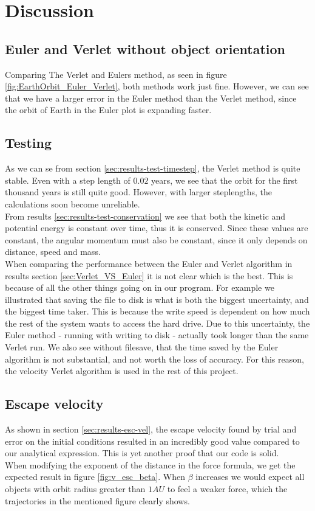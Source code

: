 \documentclass[../main.tex]{subfiles}
\begin{document}
\section{Discussion}\label{sec:discussion}

\subsection{Euler and Verlet without object orientation}
Comparing The Verlet and Eulers method, as seen in figure \ref{fig:EarthOrbit_Euler_Verlet}, both methods work just fine. However, we can see that we have a larger error in the Euler method than the Verlet method, since the orbit of Earth in the Euler plot is expanding faster.

\subsection{Testing}
As we can se from section \ref{sec:results-test-timestep}, the Verlet method is quite stable. Even with a step length of $0.02$ years, we see that the orbit for the first thousand years is still quite good. However, with larger steplengths, the calculations soon become unreliable. \\
From results \ref{sec:results-test-conservation} we see that both the kinetic and potential energy is constant over time, thus it is conserved. Since these values are constant, the angular momentum must also be constant, since it only depends on distance, speed and mass. \\
When comparing the performance between the Euler and Verlet algorithm in results section \ref{sec:Verlet_VS_Euler} it is not clear which is the best. This is because of all the other things going on in our program. For example we illustrated that saving the file to disk is what is both the biggest uncertainty, and the biggest time taker. This is because the write speed is dependent on how much the rest of the system wants to access the hard drive. Due to this uncertainty, the Euler method - running with writing to disk - actually took longer than the same Verlet run. We also see without filesave, that the time saved by the Euler algorithm is not substantial, and not worth the loss of accuracy. For this reason, the velocity Verlet algorithm is used in the rest of this project.

\subsection{Escape velocity}
As shown in section \ref{sec:results-esc-vel}, the escape velocity found by trial and error on the initial conditions resulted in an incredibly good value compared to our analytical expression. This is yet another proof that our code is solid. \\
When modifying the exponent of the distance in the force formula, we get the expected result in figure \ref{fig:v_esc_beta}. When $\beta$ increases we would expect all objects with orbit radius greater than $1AU$ to feel a weaker force, which the trajectories in the mentioned figure clearly shows.
\end{document}
